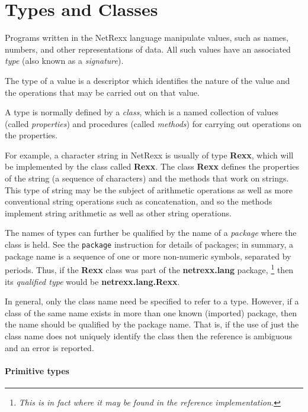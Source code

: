 \chapter{Types and Classes}\label{"id"}
\index{,}
 
Programs written in the NetRexx language manipulate values, such as
names, numbers, and other representations of data.
All such values have an associated \emph{type} (also known as a
\emph{signature}).
 
The type of a value is a descriptor which identifies the nature of the
value and the operations that may be carried out on that value.
 
A type is normally defined by a \emph{class}, which is a named
collection of values (called \emph{properties}) and procedures (called
\emph{methods}) for carrying out operations on the properties.
 
For example, a character string in NetRexx is usually of
type \textbf{Rexx}, which will be implemented by the class
called \textbf{Rexx}.
The class \textbf{Rexx} defines the properties of the string (a
sequence of characters) and the methods that work on strings.
This type of string may be the subject of arithmetic operations as well
as more conventional string operations such as concatenation, and so the
methods implement string arithmetic as well as other string operations.
 
The names of types can further be qualified by the name of a
\emph{package} where the class is held.  See the \texttt{package}
instruction for details of packages; in summary, a package name is a
sequence of one or more non-numeric symbols, separated by periods.
Thus, if the \textbf{Rexx} class was part of
the \textbf{netrexx.lang} package,
\footnote{
\emph{This is in fact where it may be found in the reference
implementation.}
}
then its \emph{qualified type} would be \textbf{netrexx.lang.Rexx}.
 
In general, only the class name need be specified to refer to a type.
However, if a class of the same name exists in more than one known
(imported) package, then the name should be qualified by the package
name.  That is, if the use of just the class name does not uniquely
identify the class then the reference is ambiguous and an error is
reported.
\subsubsection{Primitive types}\label{"id"}
 
